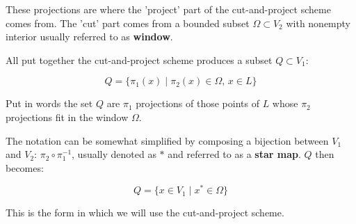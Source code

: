 \documentclass[text.tex]{subfiles}
\begin{document}
These projections are where the 'project' part of the cut-and-project scheme comes from. The 'cut' part comes from a bounded subset $\Omega\subset V_2$ with nonempty interior usually referred to as \textbf{window}. 

All put together the cut-and-project scheme produces a subset $Q\subset V_1$:

$$Q = \{ \pi_1(x)\; |\; \pi_2(x)\in \Omega,\,  x\in L \}$$

Put in words the set $Q$ are $\pi_1$ projections of those points of $L$ whose $\pi_2$ projections fit in the window $\Omega$. 

The notation can be somewhat simplified by composing a bijection between $V_1$ and $V_2$: $\pi_2\circ\pi^{-1}_1$, usually denoted as $\ast$ and referred to as a \textbf{star map}. $Q$ then becomes:

$$Q = \{ x \in V_1\; |\; x^\ast\in \Omega \}$$

This is the form in which we will use the cut-and-project scheme. 
\end{document}
